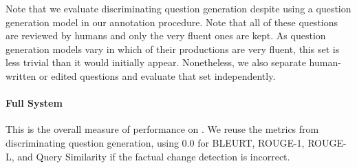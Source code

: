 Note that we evaluate discriminating question generation despite using a question generation model in our annotation procedure. Note that all of these questions are reviewed by humans and only the very fluent ones are kept. As question generation models vary in which of their productions are very fluent, this set is less trivial than it would initially appear. Nonetheless, we also separate human-written or edited questions and evaluate that set independently. 

\paragraph{Full System} This is the overall measure of performance on \dataset{}. We reuse the metrics from discriminating question generation, using 0.0 for BLEURT, ROUGE-1, ROUGE-L, and Query Similarity if the factual change detection is incorrect.  
